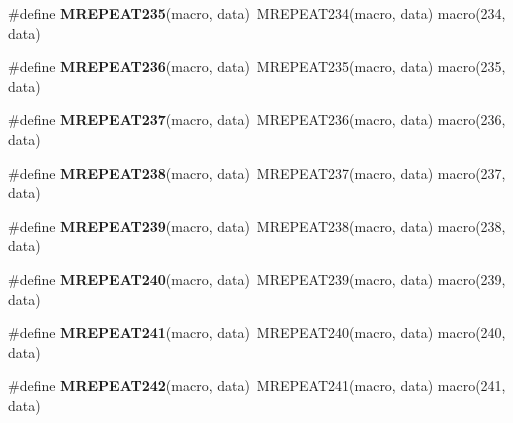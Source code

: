 \begin{DoxyCompactItemize}
\item 
\hypertarget{group__group__xmega__utils__mrepeat_ga5d3644eeaec5d2fe9d9055cc6581ed1d}{\#define {\bfseries M\-R\-E\-P\-E\-A\-T235}(macro, data)~M\-R\-E\-P\-E\-A\-T234(macro, data)   macro(234, data)}\label{group__group__xmega__utils__mrepeat_ga5d3644eeaec5d2fe9d9055cc6581ed1d}

\item 
\hypertarget{group__group__xmega__utils__mrepeat_ga91157712363f58affa1ae6b2feb50747}{\#define {\bfseries M\-R\-E\-P\-E\-A\-T236}(macro, data)~M\-R\-E\-P\-E\-A\-T235(macro, data)   macro(235, data)}\label{group__group__xmega__utils__mrepeat_ga91157712363f58affa1ae6b2feb50747}

\item 
\hypertarget{group__group__xmega__utils__mrepeat_ga0e49a6a0b3047b2d3ec37912f6f15c7a}{\#define {\bfseries M\-R\-E\-P\-E\-A\-T237}(macro, data)~M\-R\-E\-P\-E\-A\-T236(macro, data)   macro(236, data)}\label{group__group__xmega__utils__mrepeat_ga0e49a6a0b3047b2d3ec37912f6f15c7a}

\item 
\hypertarget{group__group__xmega__utils__mrepeat_ga22a583e1c58865d54827789830f38953}{\#define {\bfseries M\-R\-E\-P\-E\-A\-T238}(macro, data)~M\-R\-E\-P\-E\-A\-T237(macro, data)   macro(237, data)}\label{group__group__xmega__utils__mrepeat_ga22a583e1c58865d54827789830f38953}

\item 
\hypertarget{group__group__xmega__utils__mrepeat_gac7ec468a3f485459ffcac683dd035e65}{\#define {\bfseries M\-R\-E\-P\-E\-A\-T239}(macro, data)~M\-R\-E\-P\-E\-A\-T238(macro, data)   macro(238, data)}\label{group__group__xmega__utils__mrepeat_gac7ec468a3f485459ffcac683dd035e65}

\item 
\hypertarget{group__group__xmega__utils__mrepeat_ga88afce60134e666d2674813cc05b06aa}{\#define {\bfseries M\-R\-E\-P\-E\-A\-T240}(macro, data)~M\-R\-E\-P\-E\-A\-T239(macro, data)   macro(239, data)}\label{group__group__xmega__utils__mrepeat_ga88afce60134e666d2674813cc05b06aa}

\item 
\hypertarget{group__group__xmega__utils__mrepeat_gac11f0502fa2d597c4b9a18351f87384a}{\#define {\bfseries M\-R\-E\-P\-E\-A\-T241}(macro, data)~M\-R\-E\-P\-E\-A\-T240(macro, data)   macro(240, data)}\label{group__group__xmega__utils__mrepeat_gac11f0502fa2d597c4b9a18351f87384a}

\item 
\hypertarget{group__group__xmega__utils__mrepeat_gae6db0e42b34f92c59c76e0364573db92}{\#define {\bfseries M\-R\-E\-P\-E\-A\-T242}(macro, data)~M\-R\-E\-P\-E\-A\-T241(macro, data)   macro(241, data)}\label{group__group__xmega__utils__mrepeat_gae6db0e42b34f92c59c76e0364573db92}


\end{DoxyCompactItemize}
